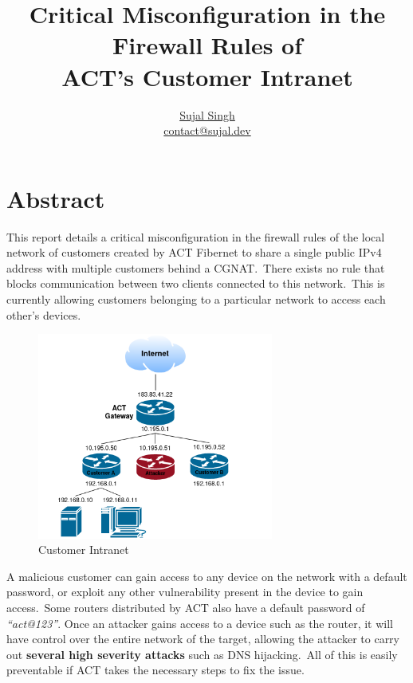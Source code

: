 \documentclass[11pt]{article}
\title{\textbf{Critical Misconfiguration in the Firewall Rules of \\ ACT's Customer Intranet}}
\author{\href{https://github.com/sujaldev}{Sujal Singh} \\ \href{mailto:contact@sujal.dev}{contact@sujal.dev}}
\date{}
\begin{document}
    \maketitle

    \section*{Abstract}
    This report details a critical misconfiguration in the firewall rules of the local network of customers created by
    ACT Fibernet to share a single public IPv4 address with multiple customers behind a CGNAT.\ There exists no rule
    that blocks communication between two clients connected to this network.\ This is currently allowing customers
    belonging to a particular network to access each other's devices.

    \begin{figure}[!htb]
        \centering
        \includegraphics[width=220pt]{./diagrams/network-hierarchy}
        \caption{Customer Intranet}
        \label{fig:1}
    \end{figure}

    A malicious customer can gain access to any device on the network with a default password, or exploit any other
    vulnerability present in the device to gain access.\ Some routers distributed by ACT also have a default password
    of \emph{``act@123''}{.} Once an attacker gains access to a device such as the router, it will have control over
    the entire network of the target, allowing the attacker to carry out \textbf{several high severity attacks} such as
    DNS hijacking.\ All of this is easily preventable if ACT takes the necessary steps to fix the issue.
\end{document}
